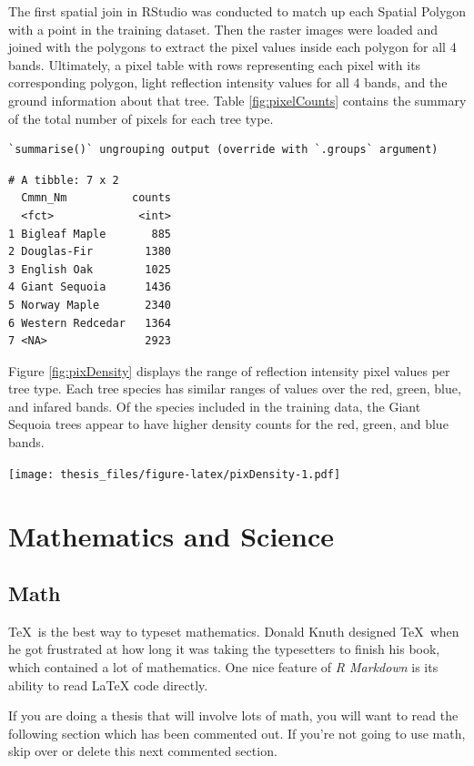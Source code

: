 \documentclass[12pt,twoside]{reedthesis}
\begin{document}
The first spatial join in RStudio was conducted to match up each Spatial Polygon with a point in the training dataset. Then the raster images were loaded and joined with the polygons to extract the pixel values inside each polygon for all 4 bands. Ultimately, a pixel table with rows representing each pixel with its corresponding polygon, light reflection intensity values for all 4 bands, and the ground information about that tree. Table \ref{fig:pixelCounts} contains the summary of the total number of pixels for each tree type.
\begin{verbatim}
`summarise()` ungrouping output (override with `.groups` argument)
\end{verbatim}
\begin{verbatim}
# A tibble: 7 x 2
  Cmmn_Nm          counts
  <fct>             <int>
1 Bigleaf Maple       885
2 Douglas-Fir        1380
3 English Oak        1025
4 Giant Sequoia      1436
5 Norway Maple       2340
6 Western Redcedar   1364
7 <NA>               2923
\end{verbatim}
Figure \ref{fig:pixDensity} displays the range of reflection intensity pixel values per tree type. Each tree species has similar ranges of values over the red, green, blue, and infared bands. Of the species included in the training data, the Giant Sequoia trees appear to have higher density counts for the red, green, and blue bands.

\texttt{[image: thesis\_files/figure-latex/pixDensity-1.pdf]}

\hypertarget{math-sci}{%
\chapter{Mathematics and Science}\label{math-sci}}

\hypertarget{math}{%
\section{Math}\label{math}}

\TeX~is the best way to typeset mathematics. Donald Knuth designed \TeX~when he got frustrated at how long it was taking the typesetters to finish his book, which contained a lot of mathematics. One nice feature of \emph{R Markdown} is its ability to read LaTeX code directly.

If you are doing a thesis that will involve lots of math, you will want to read the following section which has been commented out. If you're not going to use math, skip over or delete this next commented section.
\end{document}

